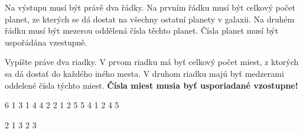 Na výstupu musí být právě dva řádky. Na prvním řádku musí být celkový počet
planet, ze kterých se dá dostat na všechny ostatní planety v galaxii. Na druhém
řádku musí být mezerou oddělená čísla těchto planet. Čísla planet musí být
uspořádána vzestupně.

Vypíšte práve dva riadky. V prvom riadku má byť celkový počet miest, z ktorých
sa dá dostať do každého iného mesta. V druhom riadku majú byť medzerami oddelené
čísla týchto miest. \textbf{Čísla miest musia byť usporiadané vzostupne!}


 6
1 3
1 4
4 2
2 1
2 5
5 4
1 2 4 5
\sampleEND

 2
1 3
2 3
~
\sampleEND



